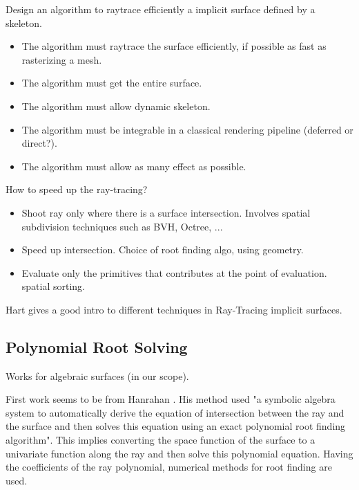 \documentclass[11pt]{article}
\numberwithin{figure}{section}
\begin{document}
\maketitle


Design an algorithm to raytrace efficiently a implicit surface defined by a skeleton.
\begin{itemize}

\item{} The algorithm must raytrace the surface efficiently, if possible as fast as rasterizing a mesh.
\item The algorithm must get the entire surface.
\item The algorithm must allow dynamic skeleton.
\item The algorithm must be integrable in a classical rendering pipeline (deferred or direct?).
\item The algorithm must allow as many effect as possible.

\end{itemize}

How to speed up the ray-tracing?

\begin{itemize}

\item{} Shoot ray only where there is a surface intersection. Involves spatial subdivision techniques such as BVH, Octree, ...
\item Speed up intersection. Choice of root finding algo, using geometry.
\item Evaluate only the primitives that contributes at the point of evaluation. spatial sorting.

\end{itemize}


Hart gives a good intro to different techniques in Ray-Tracing implicit surfaces.

\subsection{Polynomial Root Solving}

Works for algebraic surfaces (in our scope).

First work seems to be from Hanrahan \cite{Hanrahan:1983:RTA:800059.801136}. His method used "a symbolic
algebra system to automatically derive the
equation of intersection between the ray
and the surface and then solves this equation
using an exact polynomial root finding
algorithm". This implies converting the space function of the surface to a univariate function along the ray and then solve this polynomial equation.
Having the coefficients of the ray polynomial, numerical methods for root finding are used.
\end{document}
